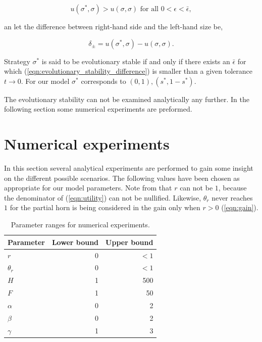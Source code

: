 \documentclass[10pt]{article}
\begin{document}
\begin{equation}\label{eqn:evolutionary_stability}
	u(\sigma^*, \sigma) > u(\sigma, \sigma)  \mbox{ for all }  0 < \epsilon < \bar{\epsilon},
\end{equation}

an let the difference between right-hand side and the left-hand size be, 

\begin{equation}\label{eqn:evolutionary_stability_difference}
	 \delta_{\pm} = u(\sigma^*, \sigma) - u(\sigma, \sigma).
\end{equation}

Strategy \(\sigma^*\) is said to be evolutionary stable if and only if there exists
an \(\bar{\epsilon}\) for which (\ref{eqn:evolutionary_stability_difference}) is
smaller than a given tolerance \(t \rightarrow 0\).  For our model \(\sigma^*\) 
corresponds to \((0, 1), (s^*, 1 - s^*)\).

The evolutionary stability can not be examined analytically any further. In the 
following section some numerical experiments are preformed. 

\section{Numerical experiments}\label{section:numerical_experiments}

In this section several analytical experiments are performed to gain some insight 
on the different possible scenarios. The following values have been chosen as
appropriate for our model parameters. Note from that \(r\) can not be \(1\), because 
the denominator of (\ref{eqn:utility}) can not be nullified. Likewise,  \(\theta_r\)
never reaches \(1\) for the partial horn is being considered in the gain only when 
\(r>0\) (\ref{eqn:gain}). 

\begin{table}[!hbtp]
	\begin{center}
      \begin{tabular}{lrr}
            \toprule
            Parameter    	& Lower bound & Upper bound\\
            \midrule
            \(r\)				& 0				& \(< 1\)		\\
            \(\theta_r\)    	& 0				&  \(< 1\)		\\
            \(H\)              	& 1				& 500			\\
            \(F\)              	& 1				& 50			\\
            \(\alpha\)      	& 0				& 2				\\
            \(\beta\)        	& 0  	            & 2				\\
            \(\gamma\)  	& 1				& 3				\\
            \bottomrule
      \end{tabular}
      \caption{Parameter ranges for numerical experiments.}
      \label{tbl:paremeters}
  	\end{center}
\end{table}
\end{document}
